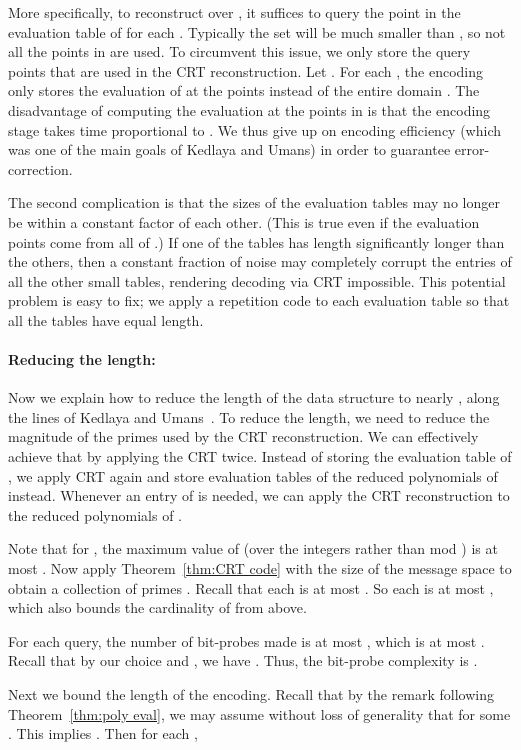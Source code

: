 \documentclass[11pt,english]{article}
\theoremstyle{definition}
\theoremstyle{remark}
\begin{document}
More specifically, to reconstruct  over ,
it suffices to query the point  in the evaluation
table of  for each . Typically the set  
will be much smaller than , so not all the points in 
are used. To circumvent this issue, we only store the query points
that are used in the CRT reconstruction. Let .
For each , the encoding only stores the evaluation of
 at the points  instead of the entire domain
. The disadvantage of computing the evaluation at the
points in  is that the encoding stage takes time proportional
to . We thus give up on encoding efficiency (which was one of the main goals
of Kedlaya and Umans) in order to guarantee error-correction.

The second complication is that the sizes of the evaluation tables
may no longer be within a constant factor of each other. (This is
true even if the evaluation points come from all of .)
If one of the tables has length significantly longer than the others,
then a constant fraction of noise may completely corrupt the entries
of all the other small tables, rendering decoding via CRT impossible.
This potential problem is easy to fix; we apply a repetition code
to each evaluation table so that all the tables have equal length.

\paragraph{\textbf{Reducing the length:}}
Now we explain how to reduce the length of the data structure to nearly
, along the lines of Kedlaya and Umans~\cite{kedl-umans}. To reduce the length, we need to reduce the magnitude
of the primes used by the CRT reconstruction. We can effectively achieve
that by applying the CRT twice. Instead of storing the evaluation
table of , we apply CRT again and store evaluation
tables of the reduced polynomials of  instead. Whenever
an entry of  is needed, we can apply the CRT reconstruction to the
reduced polynomials of . 

Note that for , the maximum value of  (over the integers rather than mod )
is at most . Now apply Theorem~\ref{thm:CRT code}
with  the size of the message space to obtain a collection
of primes . Recall that each  is at most
. So each  is at most ,
which also bounds the cardinality of  from above. 

For each query, the number of bit-probes made is at most ,
which is at most . Recall that by our
choice  and , we have . Thus,
the bit-probe complexity is .

Next we bound the length of the encoding.
Recall that by the remark following Theorem~\ref{thm:poly eval},
we may assume without loss of generality that 
for some . This implies .
Then for each ,
\end{document}
